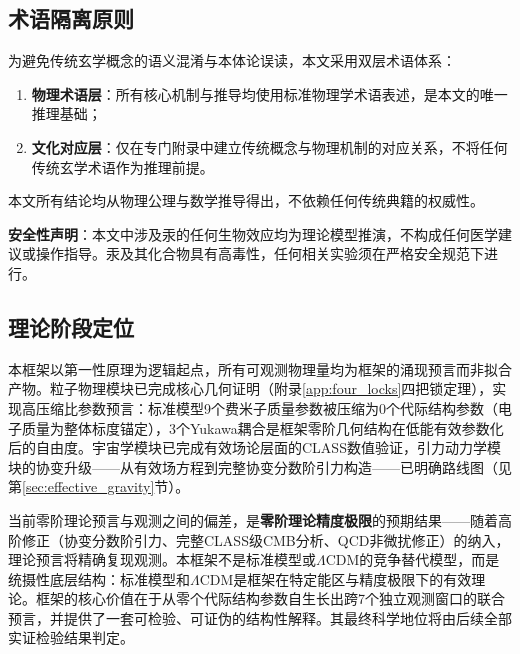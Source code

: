 \documentclass[12pt,a4paper,twocolumn]{article}
\begin{document}
\subsection{术语隔离原则}
为避免传统玄学概念的语义混淆与本体论误读，本文采用双层术语体系：
\begin{enumerate}
\item \textbf{物理术语层}：所有核心机制与推导均使用标准物理学术语表述，是本文的唯一推理基础；
\item \textbf{文化对应层}：仅在专门附录中建立传统概念与物理机制的对应关系，不将任何传统玄学术语作为推理前提。
\end{enumerate}
本文所有结论均从物理公理与数学推导得出，不依赖任何传统典籍的权威性。

\textbf{安全性声明}：本文中涉及汞的任何生物效应均为理论模型推演，不构成任何医学建议或操作指导。汞及其化合物具有高毒性，任何相关实验须在严格安全规范下进行。

\subsection{理论阶段定位}
\label{subsec:theory_positioning}
本框架以第一性原理为逻辑起点，所有可观测物理量均为框架的涌现预言而非拟合产物。粒子物理模块已完成核心几何证明（附录\ref{app:four_locks}四把锁定理），实现高压缩比参数预言：标准模型9个费米子质量参数被压缩为0个代际结构参数（电子质量为整体标度锚定），3个Yukawa耦合是框架零阶几何结构在低能有效参数化后的自由度。宇宙学模块已完成有效场论层面的CLASS数值验证，引力动力学模块的协变升级——从有效场方程到完整协变分数阶引力构造——已明确路线图（见第\ref{sec:effective_gravity}节）。

当前零阶理论预言与观测之间的偏差，是\textbf{零阶理论精度极限}的预期结果——随着高阶修正（协变分数阶引力、完整CLASS级CMB分析、QCD非微扰修正）的纳入，理论预言将精确复现观测。本框架不是标准模型或$\Lambda$CDM的竞争替代模型，而是统摄性底层结构：标准模型和$\Lambda$CDM是框架在特定能区与精度极限下的有效理论。框架的核心价值在于从零个代际结构参数自生长出跨7个独立观测窗口的联合预言，并提供了一套可检验、可证伪的结构性解释。其最终科学地位将由后续全部实证检验结果判定。
\end{document}
